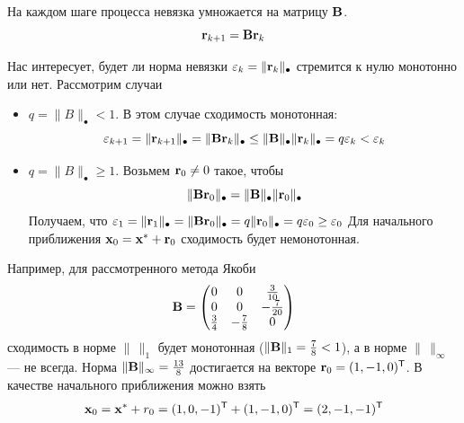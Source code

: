 \documentclass[professionalfonts,compress,unicode]{beamer}
\begin{document}
{
    На каждом шаге процесса невязка умножается на матрицу ${\bf B}$.
    \begin{equation*}
        {\bf r}_{k+1} = {\bf B} {\bf r}_k
    \end{equation*}

    Нас интересует, будет ли норма невязки $\varepsilon_k = \|{\bf r}_k\|_\bullet$
    стремится к нулю монотонно или нет. Рассмотрим случаи 
    \begin{itemize}
        \item $q = \|B\|_\bullet < 1$. В этом случае сходимость монотонная:
            $$\varepsilon_{k+1} = \|{\bf r}_{k+1}\|_\bullet = 
                \|{\bf B}{\bf r}_k\|_\bullet \leq \|{\bf B}\|_\bullet \|{\bf r}_k\|_\bullet = q
                \varepsilon_k < \varepsilon_k$$
        \item $q = \|B\|_\bullet \geq 1$. Возьмем ${\bf r}_0 \neq 0$ такое, чтобы
            $$ \|{\bf B}{\bf r}_0\|_\bullet = \|{\bf B}\|_\bullet \|{\bf r}_0\|_\bullet$$
            Получаем, что $\varepsilon_1 = \|{\bf r}_1\|_\bullet = \|{\bf B}{\bf r}_0\|_\bullet
            = q\|{\bf r}_0\|_\bullet = q \varepsilon_0 \geq \varepsilon_0$
            Для начального приближения ${\bf x}_0 = {\bf x}^* + {\bf r}_0$ сходимость будет
            немонотонная.
    \end{itemize}
}

{
    Например, для рассмотренного метода Якоби
    \begin{equation*}
	{\bf B} = \begin{pmatrix}
		0 & 0 & \frac{3}{10}\\
		0 & 0 & -\frac{7}{20}\\
		\frac{3}{4} & -\frac{7}{8} & 0
	\end{pmatrix}
    \end{equation*}
    сходимость в норме $\|\,\|_1$ будет монотонная 
    ($\|{\bf B}\|_1 = \frac{7}{8} <1$), а в норме $\|\,\|_\infty$ --- не всегда.
    Норма $\|{\bf B}\|_\infty = \frac{13}{8}$ достигается на векторе 
    ${\bf r}_0 = (1,-1,0)^\mathsf{T}$. В качестве начального приближения можно 
    взять 
    \begin{equation*}
        {\bf x}_0 = {\bf x}^* + r_0 = (1, 0, -1)^\mathsf{T} + (1,-1,0)^\mathsf{T} =
        (2,-1,-1)^\mathsf{T}
    \end{equation*}
}
\end{document}
